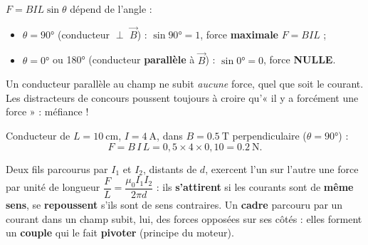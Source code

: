\documentclass[11pt,a4paper]{article}
\newcommand{\vv}[1]{\vec{#1}}\newcommand{\ds}{\displaystyle}
\begin{document}
\begin{piege}
$F=BIL\sin\theta$ dépend de l'angle :
\begin{itemize}[leftmargin=1.5em,topsep=1pt,itemsep=0pt]
  \item $\theta=\ang{90}$ (conducteur $\perp$ $\vv{B}$) : $\sin\ang{90}=1$, force \textbf{maximale} $F=BIL$ ;
  \item $\theta=\ang{0}$ ou \ang{180} (conducteur \textbf{parallèle} à $\vv{B}$) : $\sin\ang{0}=0$,
        force \textbf{NULLE}.
\end{itemize}
Un conducteur parallèle au champ ne subit \emph{aucune} force, quel que soit le courant. Les
distracteurs de concours poussent toujours à croire qu'« il y a forcément une force » : méfiance !
\end{piege}

\begin{exemplebox}
Conducteur de $L=\qty{10}{\centi\metre}$, $I=\qty{4}{\ampere}$, dans $B=\qty{0.5}{\tesla}$
perpendiculaire ($\theta=\ang{90}$) :
\[ F=B\,I\,L=0{,}5\times4\times0{,}10=\qty{0.2}{\newton}. \]
\end{exemplebox}

\begin{remarque}
Deux fils parcourus par $I_1$ et $I_2$, distants de $d$, exercent l'un sur l'autre une force par unité
de longueur $\dfrac{F}{L}=\dfrac{\mu_0 I_1 I_2}{2\pi d}$ : ils \textbf{s'attirent} si les courants sont
de \textbf{même sens}, se \textbf{repoussent} s'ils sont de sens contraires. Un \textbf{cadre} parcouru
par un courant dans un champ subit, lui, des forces opposées sur ses côtés : elles forment un
\textbf{couple} qui le fait \textbf{pivoter} (principe du moteur).
\end{remarque}
\end{document}
